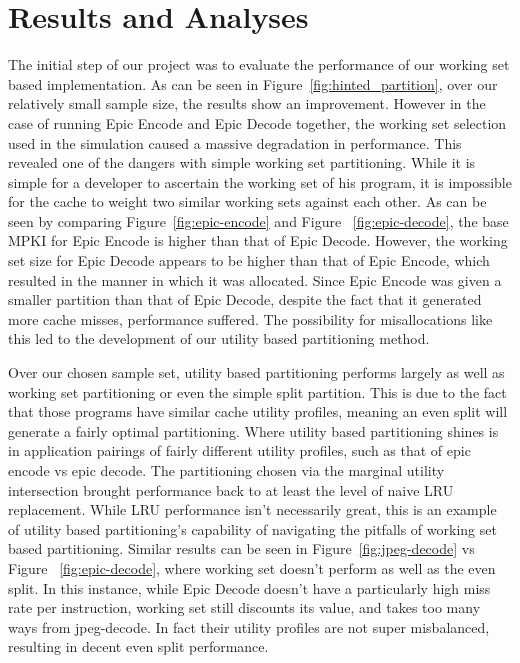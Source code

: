 \documentclass{acm_proc_article-sp}
\begin{document}
\section{Results and Analyses}
\label{sec:results}

The initial step of our project was to evaluate the performance of our working set based implementation. As can be seen in Figure~\ref{fig:hinted_partition}, over our relatively small sample size, the results show an improvement. However in the case of running Epic Encode and Epic Decode together, the working set selection used in the simulation caused a 
massive degradation in performance. This revealed one of the dangers with simple working set partitioning. While it is simple for a developer to ascertain the working set of his program, it is impossible for the cache to weight two similar working sets against each other. As can be seen by comparing  Figure~\ref{fig:epic-encode} and Figure ~\ref{fig:epic-decode}, the base MPKI for Epic Encode is higher than that of Epic Decode. However, the working set size for Epic Decode appears to be higher than that of Epic Encode, which resulted in the manner in which it was allocated. Since Epic Encode was given a smaller partition than that of Epic Decode, despite the fact that it generated more cache misses, performance suffered. The possibility for misallocations like this led to the development of our utility based partitioning method.

Over our chosen sample set, utility based partitioning performs largely as well as working set partitioning or even the simple split partition. This is due to the fact that those programs have similar cache utility profiles, meaning an even split
will generate a fairly optimal partitioning. Where utility based partitioning shines is in application pairings of fairly different
utility profiles, such as that of epic encode vs epic decode. The partitioning chosen via the marginal utility intersection brought performance back to at least the level of naive LRU replacement. While LRU performance isn't necessarily great,  this is an example of utility based partitioning's capability of navigating the pitfalls of working set based partitioning. Similar results can be seen in Figure~\ref{fig:jpeg-decode} vs Figure ~\ref{fig:epic-decode}, where working set doesn't perform as well as the even split. In this instance, while Epic Decode doesn't have a particularly high miss rate per instruction, working set still discounts its value, and takes too many ways from jpeg-decode.  In fact their utility profiles are not super misbalanced, resulting in decent even split performance.
\end{document}
